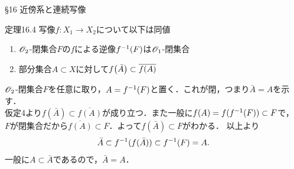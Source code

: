 \documentclass[uplatex,a4paper,dvipdfmx,aspectratio=169,11pt]{beamer}
\begin{document}
\begin{frame}[fragile]{\S 16 近傍系と連続写像}
    \begin{block}{定理16.4}
        写像$f \colon X_1 \to X_2$について以下は同値
        \begin{enumerate}
            \item[3.] $\mathscr{O}_2$-閉集合$F$の$f$による逆像$f^{\mathrm{-1}}(F)$は$\mathscr{O}_1$-閉集合
            \item[4.] 部分集合$A \subset X$に対して$f \qty(\bar A) \subset \overline{f(A)}$
        \end{enumerate}
    \end{block}

    \begin{description}[$4 \Rightarrow 3$:]
        \item[$4 \Rightarrow 3$:] 
            $\mathscr{O}_2$-閉集合$F$を任意に取り，$A = f^{\mathrm{-1}}(F)$と置く．これが閉，つまり$\bar A = A$を示す．\\
            仮定4より$f(\bar A) \subset \overline{f(A)}$が成り立つ．また一般に$f(A) = f(f^{\mathrm{-1}} (F)) \subset F$で，\\
            $F$が閉集合だから$\overline{f(A)} \subset F$．よって$f(\bar A) \subset F$がわかる．
            以上より
            \begin{equation*}
                \bar A \subset f^{\mathrm{-1}}(f(\bar A)) \subset f^{\mathrm{-1}}(F) = A.
            \end{equation*}
            一般に$A \subset \bar A$であるので，$\bar A = A$．
    \end{description}
\end{frame}
\end{document}
